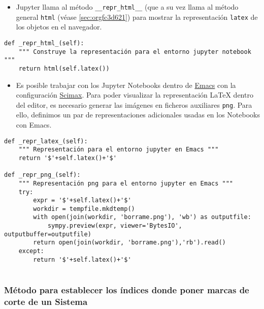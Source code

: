 \documentclass[11pt]{report}
\begin{document}
\begin{itemize}
\item Jupyter llama al método \texttt{\_\_repr\_html\_\_} (que a su vez llama al
método general \texttt{html} (véase \ref{sec:orgfc3d621}) para mostrar la representación \texttt{latex} de los
objetos en el navegador.
\end{itemize}

\begin{verbatim}
def _repr_html_(self):
    """ Construye la representación para el entorno jupyter notebook """
    return html(self.latex())

\end{verbatim}

\begin{itemize}
\item Es posible trabajar con los Jupyter Notebooks dentro de \href{https://www.gnu.org/software/emacs/}{Emacs} con la
configuración \href{https://github.com/jkitchin/scimax}{Scimax}. Para poder visualizar la representación
\LaTeX{} dentro del editor, es necesario generar las imágenes en
ficheros auxiliares \texttt{png}. Para ello, definimos un par de
representaciones adicionales usadas en los Notebooks con Emacs.
\end{itemize}

\begin{verbatim}
def _repr_latex_(self):
    """ Representación para el entorno jupyter en Emacs """
    return '$'+self.latex()+'$'

def _repr_png_(self):
    """ Representación png para el entorno jupyter en Emacs """
    try:
        expr = '$'+self.latex()+'$'
        workdir = tempfile.mkdtemp()
        with open(join(workdir, 'borrame.png'), 'wb') as outputfile:
            sympy.preview(expr, viewer='BytesIO', outputbuffer=outputfile)
        return open(join(workdir, 'borrame.png'),'rb').read()
    except:
        return '$'+self.latex()+'$'
                                                               
\end{verbatim}

\subsubsection{Método para establecer los índices donde poner marcas de corte de un Sistema}
\label{sec:org46f2ae6}
\end{document}
